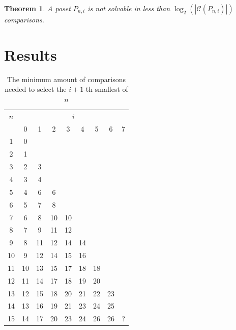 \documentclass[10pt,journal,compsoc]{IEEEtran}
\newtheorem{theorem}{Theorem}
\begin{document}
\begin{theorem}
  A poset $P_{n,i}$ is not solvable in less than $\log_2(|\mathcal{C}(P_{n,i})|)$ comparisons.


\end{theorem}

\section{Results}

\begin{table}
  \centering
  \begin{tabular}{c|cccccccc}
    $n$ & \multicolumn{8}{c}{$i$}                                   \\
        & 0                       & 1  & 2  & 3  & 4  & 5  & 6  & 7 \\ \hline
    1   & 0                                                         \\
    2   & 1                                                         \\
    3   & 2                       & 3                               \\
    4   & 3                       & 4                               \\
    5   & 4                       & 6  & 6                          \\
    6   & 5                       & 7  & 8                          \\
    7   & 6                       & 8  & 10 & 10                    \\
    8   & 7                       & 9  & 11 & 12                    \\
    9   & 8                       & 11 & 12 & 14 & 14               \\
    10  & 9                       & 12 & 14 & 15 & 16               \\
    11  & 10                      & 13 & 15 & 17 & 18 & 18          \\
    12  & 11                      & 14 & 17 & 18 & 19 & 20          \\
    13  & 12                      & 15 & 18 & 20 & 21 & 22 & 23     \\
    14  & 13                      & 16 & 19 & 21 & 23 & 24 & 25     \\
    15  & 14                      & 17 & 20 & 23 & 24 & 26 & 26 & ? \\
  \end{tabular}
  \caption{The minimum amount of comparisons needed to select the $i+1$-th smallest of $n$}
  \label{table:num-comparisons}
\end{table}
\end{document}
